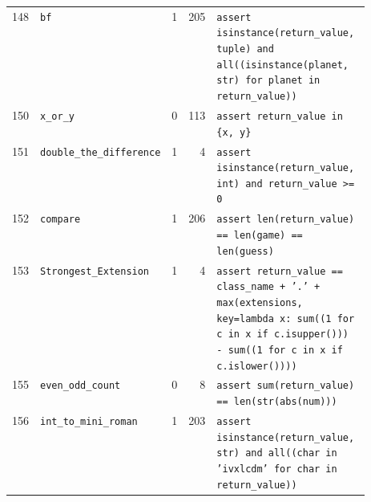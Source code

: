 \begin{footnotesize}
\begin{longtable}{@{}r l r r p{0.52\linewidth}@{}}
148 & \texttt{bf} & 1 & 205 & \texttt{assert \allowbreak{}isinstance(\allowbreak{}return\_value,\allowbreak{} \allowbreak{}tuple)\allowbreak{} \allowbreak{}and \allowbreak{}all(\allowbreak{}(\allowbreak{}isinstance(\allowbreak{}planet,\allowbreak{} \allowbreak{}str)\allowbreak{} \allowbreak{}for \allowbreak{}planet \allowbreak{}in \allowbreak{}return\_value)\allowbreak{})\allowbreak{}} \\
150 & \texttt{x\_or\_y} & 0 & 113 & \texttt{assert \allowbreak{}return\_value \allowbreak{}in \allowbreak{}\{\allowbreak{}x,\allowbreak{} \allowbreak{}y\}\allowbreak{}} \\
151 & \texttt{double\_the\_difference} & 1 & 4 & \texttt{assert \allowbreak{}isinstance(\allowbreak{}return\_value,\allowbreak{} \allowbreak{}int)\allowbreak{} \allowbreak{}and \allowbreak{}return\_value \allowbreak{}>\allowbreak{}=\allowbreak{} \allowbreak{}0} \\
152 & \texttt{compare} & 1 & 206 & \texttt{assert \allowbreak{}len(\allowbreak{}return\_value)\allowbreak{} \allowbreak{}=\allowbreak{}=\allowbreak{} \allowbreak{}len(\allowbreak{}game)\allowbreak{} \allowbreak{}=\allowbreak{}=\allowbreak{} \allowbreak{}len(\allowbreak{}guess)\allowbreak{}} \\
153 & \texttt{Strongest\_Extension} & 1 & 4 & \texttt{assert \allowbreak{}return\_value \allowbreak{}=\allowbreak{}=\allowbreak{} \allowbreak{}class\_name \allowbreak{}+\allowbreak{} \allowbreak{}'\allowbreak{}.\allowbreak{}'\allowbreak{} \allowbreak{}+\allowbreak{} \allowbreak{}max(\allowbreak{}extensions,\allowbreak{} \allowbreak{}key=\allowbreak{}lambda \allowbreak{}x:\allowbreak{} \allowbreak{}sum(\allowbreak{}(\allowbreak{}1 \allowbreak{}for \allowbreak{}c \allowbreak{}in \allowbreak{}x \allowbreak{}if \allowbreak{}c.\allowbreak{}isupper(\allowbreak{})\allowbreak{})\allowbreak{})\allowbreak{} \allowbreak{}-\allowbreak{} \allowbreak{}sum(\allowbreak{}(\allowbreak{}1 \allowbreak{}for \allowbreak{}c \allowbreak{}in \allowbreak{}x \allowbreak{}if \allowbreak{}c.\allowbreak{}islower(\allowbreak{})\allowbreak{})\allowbreak{})\allowbreak{})\allowbreak{}} \\
155 & \texttt{even\_odd\_count} & 0 & 8 & \texttt{assert \allowbreak{}sum(\allowbreak{}return\_value)\allowbreak{} \allowbreak{}=\allowbreak{}=\allowbreak{} \allowbreak{}len(\allowbreak{}str(\allowbreak{}abs(\allowbreak{}num)\allowbreak{})\allowbreak{})\allowbreak{}} \\
156 & \texttt{int\_to\_mini\_roman} & 1 & 203 & \texttt{assert \allowbreak{}isinstance(\allowbreak{}return\_value,\allowbreak{} \allowbreak{}str)\allowbreak{} \allowbreak{}and \allowbreak{}all(\allowbreak{}(\allowbreak{}char \allowbreak{}in \allowbreak{}'\allowbreak{}ivxlcdm'\allowbreak{} \allowbreak{}for \allowbreak{}char \allowbreak{}in \allowbreak{}return\_value)\allowbreak{})\allowbreak{}} \\

\end{longtable}
\end{footnotesize}

